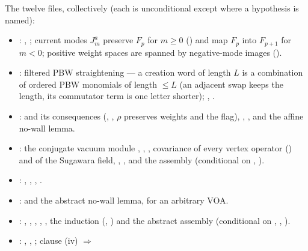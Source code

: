 The twelve files, collectively (each is unconditional except where a hypothesis is named):
\begingroup\raggedright
\begin{itemize}
\item {}: , ; current modes $J^a_m$
  preserve $F_p$ for $m\ge0$ () and map $F_p$ into $F_{p+1}$ for $m<0$; positive weight
  spaces are spanned by negative-mode images ().
\item {}: filtered PBW straightening --- a creation word of length $L$ is a
  combination of ordered PBW monomials of length $\le L$ (an adjacent swap keeps the length, its commutator term is one
  letter shorter); , .
\item {}:  and its consequences
  (, , $\rho$ preserves weights and the flag), , ,
  and the affine no-wall lemma.
\item {}: the conjugate vacuum module , ,
  , covariance of every vertex operator () and of the Sugawara field,
  , , and the assembly
   (conditional on , ).
\item {}: , ,
  , .
\item {}:  and the abstract no-wall lemma, for an arbitrary
  VOA.
\item {}: , , ,
  , , the induction (, ) and the abstract
  assembly  (conditional on , , ).
\item {}: , , ; clause (iv) $\Rightarrow$

\end{itemize}
